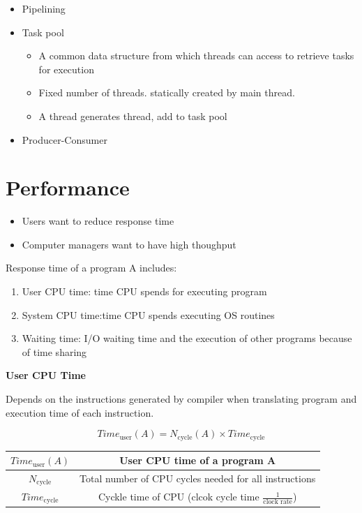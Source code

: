 \documentclass{article}
\begin{document}
\begin{itemize}
\begin{itemize}
          \end{itemize}
    \item Pipelining
    \item Task pool
          \begin{itemize}
              \item A common data structure from which threads can access to retrieve tasks for execution
              \item Fixed number of threads. statically created by main thread.
              \item A thread generates thread, add to task pool
          \end{itemize}
    \item Producer-Consumer
\end{itemize}

\section{Performance}
\begin{itemize}
    \item Users want to reduce response time
    \item Computer managers want to have high thoughput
\end{itemize}
Response time of a program A includes:
\begin{enumerate}
    \item User CPU time: time CPU spends for executing program
    \item System CPU time:time CPU spends executing OS routines
    \item Waiting time: I/O waiting time and the execution of other programs because of time sharing
\end{enumerate}

\textbf{User CPU Time}

Depends on the instructions generated by compiler when translating program and execution time of each instruction.

\[
    Time_{\text{user}} \left( A \right) = N_{\text{cycle}} \left( A \right) \times Time_{\text{cycle}}
\]
\begin{center}
    \begin{tabular}{ |c|c| }
        \hline
        $Time_{\text{user}} \left( A \right)$ & User CPU time of a program A                                        \\
        \hline
        $N_{\text{cycle}}$                    & Total number of CPU cycles needed for all instructions              \\
        \hline
        $Time_{\text{cycle}}$                 & Cyckle time of CPU (clcok cycle time $\frac{1}{\text{clock rate}}$) \\
        \hline
    \end{tabular}
\end{center}
\end{document}
